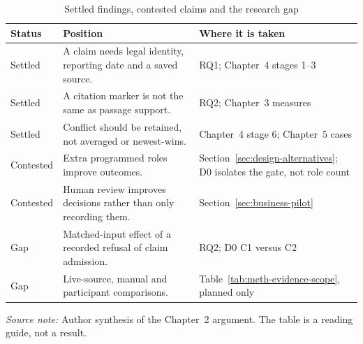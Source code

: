 \begin{table}[htbp]
  \centering
  \small
  \setlength{\tabcolsep}{3.5pt}
  \renewcommand{\arraystretch}{1.12}
  \begin{tabularx}{\textwidth}{@{}P{0.16\textwidth}P{0.30\textwidth}Y@{}}
    \toprule
    \textbf{Status} & \textbf{Position} & \textbf{Where it is taken} \\
    \midrule
    Settled & A claim needs legal identity, reporting date and a saved source. & RQ1; Chapter~4 stages 1--3 \\
    Settled & A citation marker is not the same as passage support. & RQ2; Chapter~3 measures \\
    Settled & Conflict should be retained, not averaged or newest-wins. & Chapter~4 stage 6; Chapter~5 cases \\
    Contested & Extra programmed roles improve outcomes. & Section~\ref{sec:design-alternatives}; D0 isolates the gate, not role count \\
    Contested & Human review improves decisions rather than only recording them. & Section~\ref{sec:business-pilot} \\
    Gap & Matched-input effect of a recorded refusal of claim admission. & RQ2; D0 C1 versus C2 \\
    Gap & Live-source, manual and participant comparisons. & Table~\ref{tab:meth-evidence-scope}, planned only \\
    \bottomrule
  \end{tabularx}
  \caption{Settled findings, contested claims and the research gap}
  \label{tab:lit-settled-contested-gap}
  \vspace{3pt}
  \parbox{\textwidth}{\scriptsize
    \textit{Source note:} Author synthesis of the Chapter~2 argument. The table is a reading guide,
    not a result.}
\end{table}
